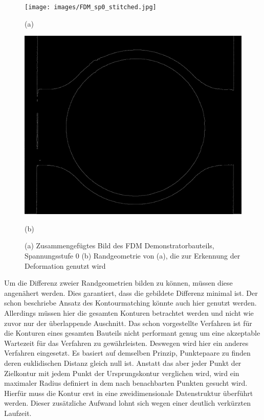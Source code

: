 \begin{figure}[H]
    \centering
    \begin{minipage}{0.49\textwidth}
        \centering
        \texttt{[image: images/FDM\_sp0\_stitched.jpg]} %
        \caption*{(a)} 
    \end{minipage}\hfill
    \begin{minipage}{0.49\textwidth}
        \centering
        \includegraphics[width=\textwidth]{images/contours_FDM_sp0_stitched.jpg} %
        \caption*{(b)}
    \end{minipage}\hfill
    \caption{(a) Zusammengefügtes Bild des FDM Demonstratorbauteils, Spannungsstufe 0
    (b) Randgeometrie von (a), die zur Erkennung der Deformation genutzt wird}
        \label{fig:stichted_contour}
\end{figure}

Um die Differenz zweier Randgeometrien bilden zu können, müssen diese angenähert werden.
Dies garantiert, dass die gebildete Differenz minimal ist.
Der schon beschriebe Ansatz des Kontourmatching könnte auch hier genutzt werden. 
Allerdings müssen hier die gesamten Konturen betrachtet werden und nicht wie zuvor nur 
der überlappende Auschnitt. Das schon vorgestellte Verfahren ist für die Konturen eines
gesamten Bauteils nicht performant genug um eine akzeptable Wartezeit für das Verfahren
zu gewährleisten. 
Deswegen wird hier ein anderes Verfahren eingesetzt. Es basiert auf demselben Prinzip,
Punktepaare zu finden deren euklidischen Distanz gleich null ist. Anstatt das aber 
jeder Punkt der Zielkontur mit jedem Punkt der Ursprungskontur verglichen wird, 
wird ein maximaler Radius definiert in dem nach benachbarten Punkten gesucht wird.
Hierfür muss die Kontur erst in eine zweidimensionale Datenstruktur überführt werden.
Dieser zusätzliche Aufwand lohnt sich wegen einer deutlich verkürzten Laufzeit.

